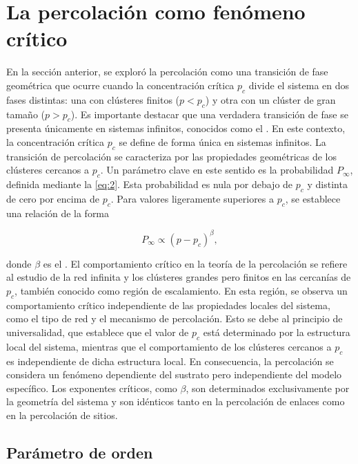 \section{La percolación como fenómeno crítico}\label{sec:percolacion_critico}


En la sección anterior, se exploró la percolación como una transición de fase geométrica  que ocurre cuando la concentración crítica $p_c$ divide el sistema en dos fases distintas: una con clústeres finitos ($p < p_c$) y otra con un clúster de gran tamaño ($p > p_c$). Es importante destacar que una verdadera transición de fase se presenta únicamente en sistemas infinitos, conocidos como el . En este contexto, la concentración crítica $p_c$ se define de forma única en sistemas infinitos. La transición de percolación se caracteriza por las propiedades geométricas de los clústeres cercanos a $p_c$. Un parámetro clave en este sentido es la probabilidad $P_\infty$, definida mediante la  \cref{eq:2}. Esta probabilidad es nula por debajo de $p_c$ y distinta de cero por encima de $p_c$. Para valores ligeramente superiores a $p_c$, se establece una relación de la forma

 \begin{equation}\label{eq:10}
	P_\infty \propto \left(p-p_c\right)^\beta,
\end{equation}

donde $\beta$ es el . El comportamiento crítico en la teoría de la percolación se refiere al estudio de la red infinita y los clústeres grandes pero finitos en las cercanías de $p_c$, también conocido como región de escalamiento. En esta región, se observa un comportamiento crítico independiente de las propiedades locales del sistema, como el tipo de red y el mecanismo de percolación. Esto se debe al principio de universalidad, que establece que el valor de $p_c$ está determinado por la estructura local del sistema, mientras que el comportamiento de los clústeres cercanos a $p_c$ es independiente de dicha estructura local. En consecuencia, la percolación se considera un fenómeno dependiente del sustrato pero independiente del modelo específico. Los exponentes críticos, como $\beta$, son determinados exclusivamente por la geometría del sistema y son idénticos tanto en la percolación de enlaces como en la percolación de sitios.

 \subsection{Parámetro de orden}\label{sec:parametro_orden}
 
